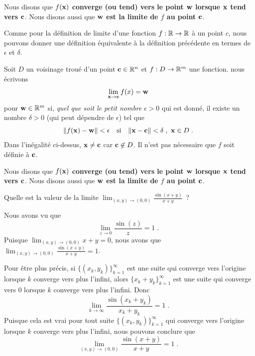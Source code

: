 {\begin{defn}
Nous disons que
{\bfseries $f(\mathbf{x})$ converge (ou tend) vers le point $\mathbf{w}$
lorsque $\mathbf{x}$ tend vers $\mathbf{c}$}.  Nous disons aussi que
{\bfseries $\mathbf{w}$ est la limite de $f$ au point $\mathbf{c}$}.
\end{defn}

Comme pour la définition de limite d'une fonction
$f:\mathbb{R}\rightarrow \mathbb{R}$ à un point $c$, nous pouvons donner une
définition équivalente à la définition précédente en termes de
$\epsilon$ et $\delta$.

\begin{defn}[+\theory] 
Soit $D$ un voisinage troué d'un point $\mathbf{c} \in \mathbb{R}^n$ et
$f:D\rightarrow \mathbb{R}^m$ une fonction.  nous écrivons
\[
\lim_{\mathbf{x}\rightarrow \mathbf{c}} f(x) = \mathbf{w}
\]
pour $\mathbf{w}\in \mathbb{R}^m$ si,
{\em quel que soit le petit nombre $\epsilon >0$}
qui est donné, il existe un nombre $\delta >0$ (qui peut dépendre
de $\epsilon$) tel que
\[
\|f(\mathbf{x}) - \mathbf{w}\| < \epsilon  \quad \text{si} \quad 
\|\mathbf{x} - \mathbf{c}\| < \delta\; ,\ \mathbf{x} \in D \; .
\]
Dans l'inégalité ci-dessus, $\mathbf{x} \neq \mathbf{c}$ car
$\mathbf{c}\not\in D$.  Il n'est pas nécessaire que $f$ soit
définie à $\mathbf{c}$.

Nous disons que
{\bfseries $f(\mathbf{x})$ converge (ou tend) vers le point $\mathbf{w}$
lorsque $\mathbf{x}$ tend vers $\mathbf{c}$}.  Nous disons aussi que
{\bfseries $\mathbf{w}$ est la limite de $f$ au point $\mathbf{c}$}.
\end{defn}

\begin{egg}
Quelle est la valeur de la limite
$\displaystyle \lim_{(x,y)\rightarrow (0,0)} \frac{\sin(x+y)}{x+y}$\ ?

Nous avons vu que
\[
\lim_{z\rightarrow 0} \frac{\sin(z)}{z} = 1 \; .
\]
Puisque $\displaystyle \lim_{(x,y)\rightarrow (0,0)} x + y = 0$,
nous avons que
$\displaystyle \lim_{(x,y)\rightarrow (0,0)} \frac{\sin(x+y)}{x+y} = 1$.

Pour être plus précis, si $\displaystyle \{ (x_k,y_k) \}_{k=1}^\infty$
est une suite qui converge vers l'origine lorsque $k$ converge vers
plus l'infini, alors $\displaystyle \{ x_k+y_k \}_{k=1}^\infty$ est
une suite qui converge vers $0$ lorsque $k$ converge vers plus
l'infini.  Donc
\[
\lim_{k\rightarrow \infty} \frac{\sin(x_k+y_k)}{x_k+y_k} = 1 \; .
\]
Puisque cela est vrai pour tout suite
$\displaystyle \{ (x_k,y_k) \}_{k=1}^\infty$ qui converge vers
l'origine lorsque $k$ converge vers plus l'infini, nous pouvons conclure
que
\[
\lim_{(x,y)\rightarrow (0,0)} \frac{\sin(x+y)}{x+y} = 1 \; .
\]
\label{sinxsurx}
\end{egg}

}
